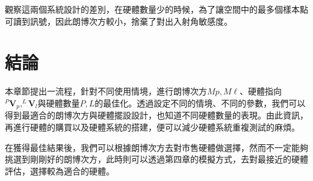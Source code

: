     觀察這兩個系統設計的差別，在硬體數量少的時候，為了讓空間中的最多個樣本點可讀到訊號，因此朗博次方較小，捨棄了對出入射角敏感度。



\section{結論}

本章節提出一流程，針對不同使用情境，進行朗博次方$Mp,M\ell$、硬體指向$^{P}\boldsymbol{V}_p,^{L}\boldsymbol{V}_l$與硬體數量$P,L$的最佳化。透過設定不同的情境、不同的參數，我們可以得到最適合的朗博次方與硬體擺設設計，也知道不同硬體數量的表現。由此資訊，再進行硬體的購買以及硬體系統的搭建，便可以減少硬體系統重複測試的麻煩。

在獲得最佳結果後，我們可以根據朗博次方去對市售硬體做選擇，然而不一定能夠挑選到剛剛好的朗博次方，此時則可以透過第四章的模擬方式，去對最接近的硬體評估，選擇較為適合的硬體。












